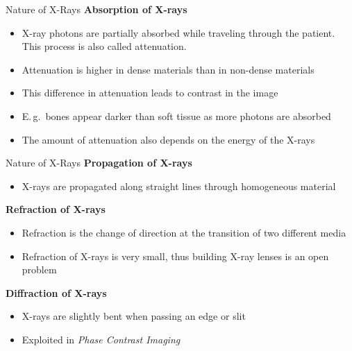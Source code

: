\begin{frame}{Nature of X-Rays}
    \textbf{Absorption of X-rays}
    \begin{itemize}
        \setlength\itemsep{0.2cm}
        \item X-ray photons are partially absorbed while traveling through the patient. This process is also called attenuation.
        \item Attenuation is higher in dense materials than in non-dense materials
        \item This difference in attenuation leads to contrast in the image
        \item E.\,g.\ bones appear darker than soft tissue as more photons are absorbed
        \item The amount of attenuation also depends on the energy of the X-rays
    \end{itemize}
\end{frame}


\begin{frame}{Nature of X-Rays}
    \textbf{Propagation of X-rays}
    \begin{itemize}
        \item X-rays are propagated along straight lines through homogeneous material
    \end{itemize}
    \vspace{0.5cm}
    \textbf{Refraction of X-rays}
    \begin{itemize}
        \item Refraction is the change of direction at the transition of two different media
        \item Refraction of X-rays is very small, thus building X-ray lenses is an open problem
    \end{itemize}
    \vspace{0.5cm}
    \textbf{Diffraction of X-rays}
    \begin{itemize}
        \item X-rays are slightly bent when passing an edge or slit
        \item Exploited in \emph{Phase Contrast Imaging}
    \end{itemize}
\end{frame}



